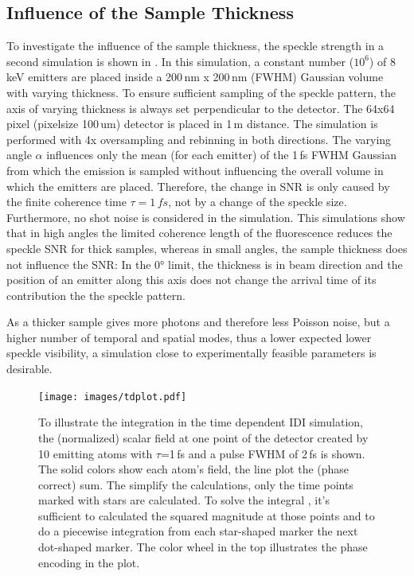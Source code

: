 \subsection{Influence of the Sample Thickness}
To investigate the influence of the sample thickness, the speckle strength in a second simulation is shown in . In this simulation, a constant number ($10^6$) of 8\,keV emitters are placed inside a 200\,nm x 200\,nm (FWHM) Gaussian volume with varying thickness. To ensure sufficient sampling of the speckle pattern, the axis of varying thickness is always set perpendicular to the detector. The 64x64 pixel (pixelsize 100\,um) detector is placed in 1\,m distance. The simulation is performed with 4x oversampling and rebinning in both directions. The varying angle $\alpha$ influences only the mean (for each emitter) of the 1\,fs FWHM Gaussian from which the emission is sampled without influencing the overall volume in which the emitters are placed. Therefore, the change in SNR is only caused by the finite coherence time $\tau=1\,fs$, not by a change of the speckle size. Furthermore, no shot noise is considered in the simulation.
This simulations show that in high angles the limited coherence length of the fluorescence reduces the speckle SNR for thick samples, whereas in small angles, the sample thickness does not influence the SNR: In the 0° limit, the thickness is in beam direction and the position of an emitter along this axis does not change the arrival time of its contribution the the speckle pattern.




 As a thicker sample gives more photons and therefore less Poisson noise, but a higher number of temporal and spatial modes, thus a lower expected lower speckle visibility, a simulation close to experimentally feasible parameters is desirable.



\begin{figure}
	   \centering
		\texttt{[image: images/tdplot.pdf]}
	\caption[Integration in Time Dependent IDI Simulation]{To illustrate the integration in the time dependent IDI simulation, the (normalized) scalar field at one point of the detector created by 10 emitting atoms with $\tau$=1\,fs and a pulse FWHM of 2\,fs is shown. The solid colors show each atom's field, the line plot the (phase correct) sum. The simplify the calculations, only the time points marked with stars are calculated. To solve the integral , it's sufficient to calculated the squared magnitude at those points and to do a piecewise integration from each star-shaped marker the next dot-shaped marker. The color wheel in the top illustrates the phase encoding in the plot.}
	\label{fig:tdplot}
\end{figure}


